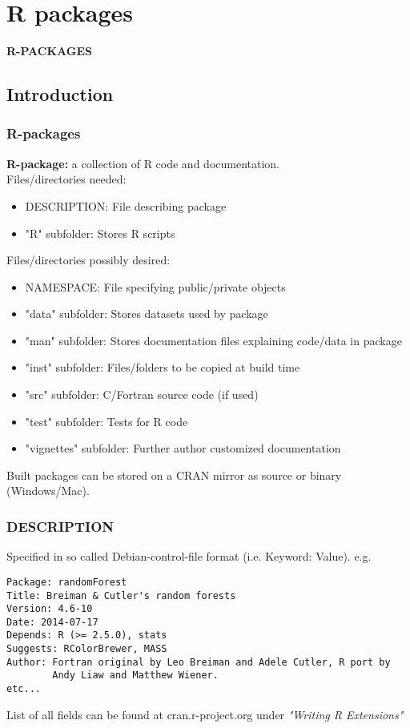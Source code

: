 \documentclass{beamer}
\begin{document}
\section{R packages}
\begin{frame}
\fontsize{18}{7.2}\selectfont
\centering
\textbf{R-PACKAGES}
\end{frame}


\subsection{Introduction}
\begin{frame}
\frametitle{R-packages}
\textbf{R-package:} a collection of R code and documentation. \\
\vspace{.05in}
Files/directories needed:
\begin{itemize}
  \item DESCRIPTION: File describing package
  \item "R" subfolder: Stores R scripts
\end{itemize}
Files/directories possibly desired:
\begin{itemize}
  \item NAMESPACE: File specifying public/private objects
  \item "data" subfolder: Stores datasets used by package
  \item "man" subfolder: Stores documentation files explaining code/data in package
  \item "inst" subfolder: Files/folders to be copied at build time
  \item "src" subfolder: C/Fortran source code (if used)
  \item "test" subfolder: Tests for R code
  \item "vignettes" subfolder: Further author customized documentation
\end{itemize}
Built packages can be stored on a CRAN mirror as source or binary (Windows/Mac).
\end{frame}


\begin{frame}[fragile]
\frametitle{DESCRIPTION}
Specified in so called Debian-control-file format (i.e. Keyword: Value). e.g.
\begin{verbatim}
Package: randomForest
Title: Breiman & Cutler's random forests 
Version: 4.6-10
Date: 2014-07-17
Depends: R (>= 2.5.0), stats
Suggests: RColorBrewer, MASS
Author: Fortran original by Leo Breiman and Adele Cutler, R port by
        Andy Liaw and Matthew Wiener.
etc...
\end{verbatim}
List of all fields can be found at cran.r-project.org under \it{"Writing R Extensions"}
\end{frame}
\end{document}
